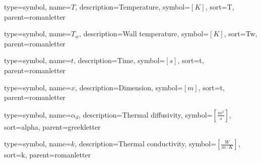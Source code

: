 {
	type=symbol, %
	name={\ensuremath{T}}, %
	description={Temperature}, %
	symbol={$\left[K\right]$}, %
	sort=T, %
	parent=romanletter %
}

{
	type=symbol, %
	name={\ensuremath{T_w}}, %
	description={Wall temperature}, %
	symbol={$\left[K\right]$}, %
	sort=Tw, %
	parent=romanletter %
}

{
	type=symbol, %
	name={\ensuremath{t}}, %
	description={Time}, %
	symbol={$\left[s\right]$}, %
	sort=t, %
	parent=romanletter %
}

{
	type=symbol, %
	name={\ensuremath{x}}, %
	description={Dimension}, %
	symbol={$\left[m\right]$}, %
	sort=t, %
	parent=romanletter %
}

{
	type=symbol, %
	name={\ensuremath{\alpha_d}}, %
	description={Thermal diffusivity}, %
	symbol={$\left[\frac{m^2}{s}\right]$}, %
	sort=alpha, %
	parent=greekletter %
}

{
	type=symbol, %
	name={\ensuremath{k}}, %
	description={Thermal conductivity}, %
	symbol={$\left[\frac{W}{m\cdot K}\right]$}, %
	sort=k, %
	parent=romanletter %
}


